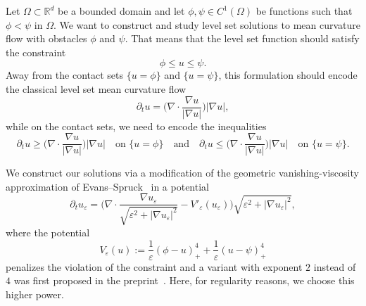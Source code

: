 \documentclass{amsart}
\theoremstyle{definition}
\begin{document}
Let $\Omega\subset \mathbb{R}^d$ be a bounded domain and let $\phi , \psi \in C^1 (\Omega)$ be functions 
such that $\phi < \psi $ in $\Omega$.
We want to construct and study level set solutions to mean curvature flow with obstacles $\phi$ and $\psi$.
That means that the level set function should satisfy the constraint 
\begin{equation}\label{eq:levelset_constraint}
    \phi \leq u \leq \psi.
\end{equation}
Away from the contact sets $\{u=\phi\}$ and $\{u=\psi\}$, this formulation should encode the classical level set mean curvature flow
\begin{equation}\label{eq:levelset_interior}
\partial_t u 
    =\Big(\nabla \cdot \frac{\nabla u}{|\nabla u|}  \Big)|\nabla u|,
\end{equation}
while on the contact sets, we need to encode the inequalities
\begin{equation}\label{eq:levelset_contact}
   \partial_t u 
    \geq\Big(\nabla \cdot \frac{\nabla u}{|\nabla u|}  \Big)|\nabla u| \quad \text{on }\{u=\phi\}
\quad \text{and} \quad 
   \partial_t u 
    \leq \Big(\nabla \cdot \frac{\nabla u}{|\nabla u|}  \Big)|\nabla u| \quad \text{on } \{u=\psi\}.
\end{equation}

We construct our solutions via a modification of the geometric vanishing-viscosity approximation of Evans--Spruck~\cite{MR1100206} in a potential
\[
    \partial_t u_\varepsilon 
    =\Big(\nabla \cdot \frac{\nabla u_\varepsilon}{\sqrt{\varepsilon^2+|\nabla u_\varepsilon|^2}} - V'_\varepsilon (u_\varepsilon)\Big)
    \sqrt{\varepsilon^2+|\nabla u_\varepsilon|^2},
\]
where the potential
\[
V_\varepsilon (u)
:= 
\frac{1}{\varepsilon} (\phi -u ) _+  ^4
+\frac{1}{\varepsilon} (u-\psi)_+^4
\]
penalizes the violation of the constraint and a variant with exponent $2$ instead of $4$ was first proposed in the preprint~\cite{Mercier}. Here, for regularity reasons, we choose this higher power.
\end{document}
